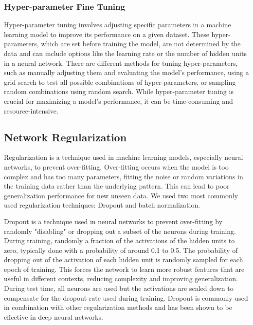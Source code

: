 \subsubsection{Hyper-parameter Fine Tuning}%

Hyper-parameter tuning involves adjusting specific parameters in a machine learning model to improve its performance on a given dataset. These hyper-parameters, which are set before training the model, are not determined by the data and can include options like the learning rate or the number of hidden units in a neural network. There are different methods for tuning hyper-parameters, such as manually adjusting them and evaluating the model's performance, using a grid search to test all possible combinations of hyper-parameters, or sampling random combinations using random search. While hyper-parameter tuning is crucial for maximizing a model's performance, it can be time-consuming and resource-intensive.


\subsection{Network Regularization}%

Regularization is a technique used in machine learning models, especially neural networks, to prevent over-fitting. Over-fitting occurs when the model is too complex and has too many parameters, fitting the noise or random variations in the training data rather than the underlying pattern. This can lead to poor generalization performance for new unseen data.
We used two most commonly used regularization techniques: Dropout and batch normalization. 

Dropout \cite{srivastava2014dropout}  is a technique used in neural networks to prevent over-fitting by randomly "disabling" or dropping out a subset of the neurons during training. During training, randomly a fraction of the activations of the hidden units to zero, typically done with a probability of around 0.1 to 0.5. The probability of dropping out of the activation of each hidden unit is randomly sampled for each epoch of training. This forces the network to learn more robust features that are useful in different contexts, reducing complexity and improving generalization. During test time, all neurons are used but the activations are scaled down to compensate for the dropout rate used during training. Dropout is commonly used in combination with other regularization methods and has been shown to be effective in deep neural networks.

